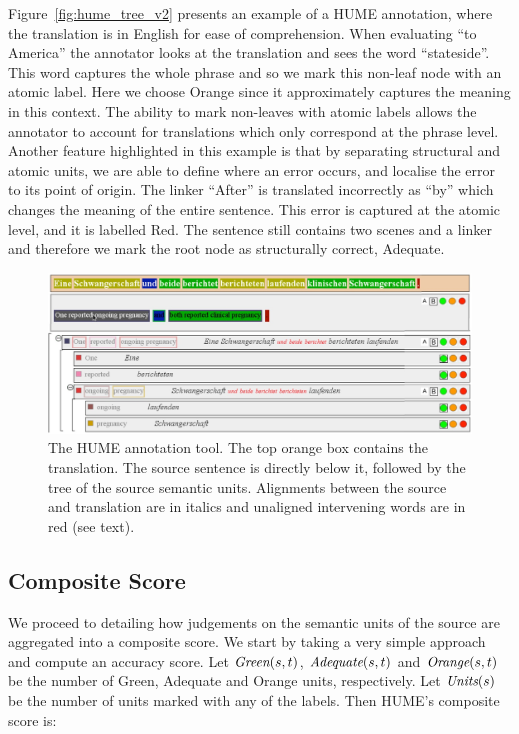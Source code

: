 \documentclass[11pt,letterpaper]{article}
\def\func#1{\text{\it #1}}  %
\def\Adequate{\func{Adequate}}
\def\Green{\func{Green}}
\def\Orange{\func{Orange}}
\def\Units{\func{Units}}
\begin{document}
Figure~\ref{fig:hume_tree_v2} presents an example of a HUME
annotation, where the translation is in English for ease of comprehension.
When evaluating ``to America'' the annotator looks at the translation and sees the
word ``stateside''. This word captures the whole phrase and so we mark this
non-leaf node with an atomic label. Here we choose Orange since
it approximately captures the meaning in this context.
The ability to mark non-leaves with atomic labels allows
the annotator to account for translations which only correspond at the phrase
level. Another feature highlighted in this example is that by separating structural
and atomic units, we are able to define where an error occurs, and localise
the error to its point of origin. The linker ``After'' is translated incorrectly as ``by''
which changes the meaning of the entire sentence. This error is captured at
the atomic level, and it is labelled Red. The sentence still contains two scenes and
a linker and therefore we mark the root node as structurally correct, Adequate.

\begin{figure}[t]
    \begin{center}
    \includegraphics[width=.8\textwidth]{hume_interface2.jpg}
    \caption{The HUME annotation tool. The top orange box
      contains the translation. The source sentence is directly below it, followed by the tree of the source
      semantic units. Alignments between the source and translation are in italics and
      unaligned intervening words are in red (see text).}
    \label{fig:interface}
    \end{center}
\end{figure}


\subsection{Composite Score}\label{sec:score}

We proceed to detailing how judgements on the semantic units
of the source are aggregated into a composite score. 
We start by taking a very simple approach and compute an accuracy score.
Let $\Green(s,t)$, $\Adequate(s,t)$ and $\Orange(s,t)$ be the number of Green, Adequate and Orange
units, respectively. Let $\Units(s)$ be the number of units marked with any of the labels.
Then HUME's composite score is:
\end{document}
